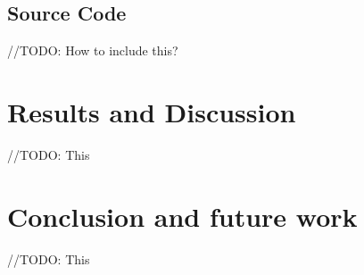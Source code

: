 \documentclass[journal]{IEEEtran}
\begin{document}
\subsection{Source Code}
//TODO: How to include this?

\section{Results and Discussion}
//TODO: This

\section{Conclusion and future work}
//TODO: This





\end{document}
